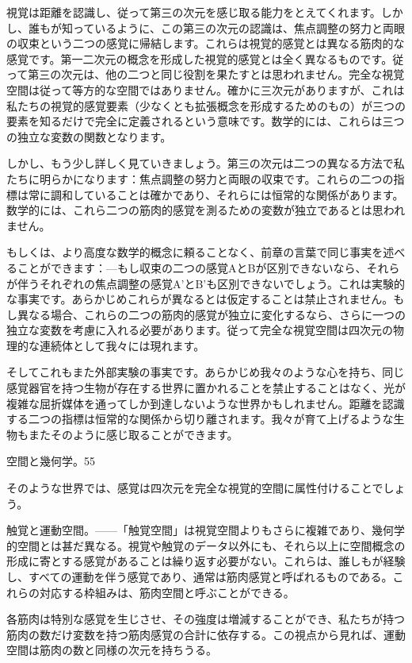 \documentclass[a4paper,11pt,openany]{ltjsbook}
\begin{document}
視覚は距離を認識し、従って第三の次元を感じ取る能力をとえてくれます。しかし、誰もが知っているように、この第三の次元の認識は、焦点調整の努力と両眼の収束という二つの感覚に帰結します。これらは視覚的感覚とは異なる筋肉的な感覚です。第一二次元の概念を形成した視覚的感覚とは全く異なるものです。従って第三の次元は、他の二つと同じ役割を果たすとは思われません。完全な視覚空間は従って等方的な空間ではありません。確かに三次元がありますが、これは私たちの視覚的感覚要素（少なくとも拡張概念を形成するためのもの）が三つの要素を知るだけで完全に定義されるという意味です。数学的には、これらは三つの独立な変数の関数となります。

しかし、もう少し詳しく見ていきましょう。第三の次元は二つの異なる方法で私たちに明らかになります：焦点調整の努力と両眼の収束です。これらの二つの指標は常に調和していることは確かであり、それらには恒常的な関係があります。数学的には、これら二つの筋肉的感覚を測るための変数が独立であるとは思われません。

もしくは、より高度な数学的概念に頼ることなく、前章の言葉で同じ事実を述べることができます：—もし収束の二つの感覚AとBが区別できないなら、それらが伴うそれぞれの焦点調整の感覚A'とB'も区別できないでしょう。これは実験的な事実です。あらかじめこれらが異なるとは仮定することは禁止されません。もし異なる場合、これらの二つの筋肉的感覚が独立に変化するなら、さらに一つの独立な変数を考慮に入れる必要があります。従って完全な視覚空間は四次元の物理的な連続体として我々には現れます。

そしてこれもまた外部実験の事実です。あらかじめ我々のような心を持ち、同じ感覚器官を持つ生物が存在する世界に置かれることを禁止することはなく、光が複雑な屈折媒体を通ってしか到達しないような世界かもしれません。距離を認識する二つの指標は恒常的な関係から切り離されます。我々が育て上げるような生物もまたそのように感じ取ることができます。

空間と幾何学。55

そのような世界では、感覚は四次元を完全な視覚的空間に属性付けることでしょう。

触覚と運動空間。——「触覚空間」は視覚空間よりもさらに複雑であり、幾何学的空間とは甚だ異なる。視覚や触覚のデータ以外にも、それら以上に空間概念の形成に寄とする感覚があることは繰り返す必要がない。これらは、誰しもが経験し、すべての運動を伴う感覚であり、通常は筋肉感覚と呼ばれるものである。これらの対応する枠組みは、筋肉空間と呼ぶことができる。

各筋肉は特別な感覚を生じさせ、その強度は増減することができ、私たちが持つ筋肉の数だけ変数を持つ筋肉感覚の合計に依存する。この視点から見れば、運動空間は筋肉の数と同様の次元を持ちうる。
\end{document}
